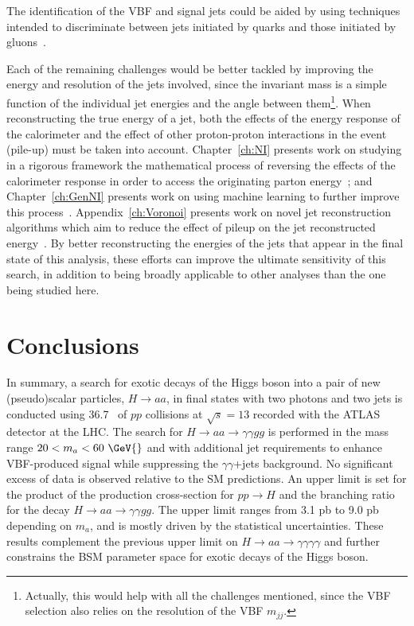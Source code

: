 The identification of the VBF and signal jets could be aided by using techniques intended to discriminate between jets initiated by quarks and those initiated by gluons~\cite{ATL-PHYS-PUB-2017-009,Aad:2014gea,ATLAS-CONF-2016-034,ATL-PHYS-PUB-2017-017}.

Each of the remaining challenges would be better tackled by improving the energy and \pt{} resolution of the jets involved, since the invariant mass is a simple function of the individual jet energies and the angle between them\footnote{Actually, this would help with all the challenges mentioned, since the VBF selection also relies on the resolution of the VBF $m_{jj}$.}.
When reconstructing the true energy of a jet, both the effects of the energy response of the calorimeter and the effect of other proton-proton interactions in the event (pile-up) must be taken into account.
Chapter~\ref{ch:NI} presents work on studying in a rigorous framework the mathematical process of reversing the effects of the calorimeter response in order to access the originating parton energy~\cite{Cukierman:2016dkb};
and Chapter~\ref{ch:GenNI} presents work on using machine learning to further improve this process~\cite{ATL-PHYS-PUB-2018-013}.
Appendix~\ref{ch:Voronoi} presents work on novel jet reconstruction algorithms which aim to reduce the effect of pileup on the jet reconstructed energy~\cite{ATLAS-CONF-2017-065}.
By better reconstructing the energies of the jets that appear in the final state of this analysis, these efforts can improve the ultimate sensitivity of this search, in addition to being broadly applicable to other analyses than the one being studied here. 

\section{Conclusions}
\label{sec:HBSM:conclusion}
In summary, a search for exotic decays of the Higgs boson into a pair of new (pseudo)scalar particles,
$H\to aa$, in final states with two photons 
and two jets is conducted using 36.7~\ifb{} of $pp$ collisions at $\sqrt{s}=13$ \TeV{} recorded 
with the ATLAS detector at the LHC. The search for $H\to aa \to \gamma\gamma gg$ is performed
in the mass range $20 < m_a < 60~\GeV{}$ and with additional jet requirements 
to enhance VBF-produced signal while suppressing the $\gamma\gamma$+jets background.
No significant excess of data is observed relative to the SM predictions. An upper limit
is set for the product of the production cross-section for $pp\to H$ and the branching
ratio for the decay $H\to aa\to\gamma\gamma gg$. The upper limit ranges from 3.1 pb to 9.0 pb depending
on $m_a$, and is mostly driven by the statistical uncertainties.
These results complement the previous upper limit on $H\to aa\to\gamma\gamma\gamma\gamma$ and
further constrains the BSM parameter space for exotic decays of the Higgs boson.

